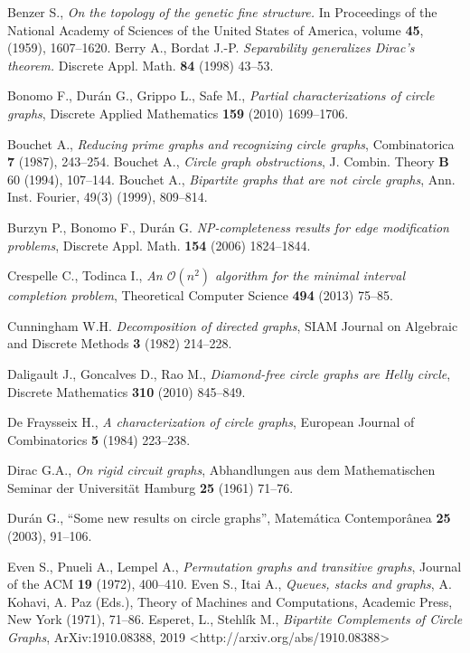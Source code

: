 \documentclass[12pt]{book}
\theoremstyle{plain}
\theoremstyle{remark}
\begin{document}
\begin{thebibliography}{Weibel}



 Benzer S., \emph{On the topology of the genetic fine structure.} In Proceedings of the National Academy of Sciences of the United States of America, volume \textbf{45}, (1959), 1607--1620.
 Berry A., Bordat J.-P. \emph{Separability generalizes Dirac's theorem.} Discrete Appl. Math. \textbf{84} (1998) 43--53.

 Bonomo F., Dur\'an G., Grippo L., Safe M., \emph{Partial characterizations of circle graphs}, Discrete Applied Mathematics \textbf{159} (2010) 1699--1706.      
      
 Bouchet A., \emph{Reducing prime graphs and recognizing circle graphs}, Combinatorica \textbf{7} (1987), 243--254.
 Bouchet A., \emph{Circle graph obstructions}, J. Combin. Theory \textbf{B} 60 (1994), 107--144.
 Bouchet A., \emph{Bipartite graphs that are not circle graphs}, Ann. Inst. Fourier, 49(3) (1999), 809--814.

 Burzyn P., Bonomo F., Dur\'an G.\emph{ NP-completeness results for edge modification problems}, Discrete Appl. Math. \textbf{154} (2006) 1824--1844.

 Crespelle C., Todinca I., \emph{An $\mathcal{O}(n^2)$ algorithm for the minimal interval completion problem}, 
Theoretical Computer Science \textbf{494} (2013) 75--85.

 Cunningham W.H. \emph{Decomposition of directed graphs}, 
SIAM Journal on Algebraic and Discrete Methods \textbf{3} (1982) 214--228.


 Daligault J., Goncalves D., Rao M., \emph{Diamond-free circle graphs are Helly circle}, Discrete Mathematics \textbf{310} (2010) 845--849.

 De Fraysseix H., \emph{A characterization of circle graphs}, European Journal of Combinatorics \textbf{5} (1984) 223--238.

 Dirac G.A., \emph{On rigid circuit graphs}, Abhandlungen aus dem Mathematischen Seminar der Universit\"at Hamburg \textbf{25} (1961) 71--76.

 Dur\'an G., ``Some new results on circle graphs'', Matem\'atica Contempor\^anea \textbf{25} (2003), 91--106.


 Even S., Pnueli A., Lempel A., \emph{Permutation graphs and transitive graphs}, Journal of the ACM \textbf{19} (1972), 400--410.
 Even S., Itai A., \emph{Queues, stacks and graphs}, A. Kohavi, A. Paz (Eds.), Theory of Machines and Computations, Academic Press, New York (1971), 71--86.
 Esperet, L., Stehlík M., \emph{Bipartite Complements of Circle Graphs}, ArXiv:1910.08388, 2019 <http://arxiv.org/abs/1910.08388> 




\end{thebibliography}
\end{document}
